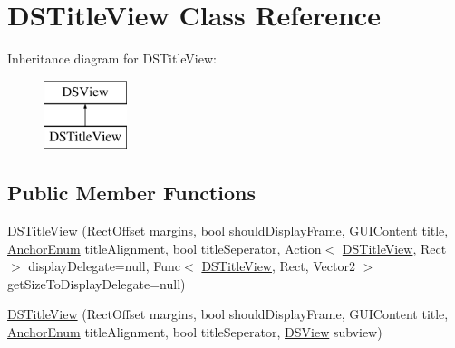 \hypertarget{class_d_s_title_view}{\section{D\+S\+Title\+View Class Reference}
\label{class_d_s_title_view}
}
Inheritance diagram for D\+S\+Title\+View\+:\begin{figure}[H]
\begin{center}
\leavevmode
\includegraphics[height=2.000000cm]{class_d_s_title_view}
\end{center}
\end{figure}
\subsection*{Public Member Functions}
\begin{DoxyCompactItemize}
\item 
\hyperlink{class_d_s_title_view_af8794de8b62891cface73e428b6c067b}{D\+S\+Title\+View} (Rect\+Offset margins, bool should\+Display\+Frame, G\+U\+I\+Content title, \hyperlink{class_d_s_view_a8b41b9ec1b18bd33872a37cbd3a2dbe1}{Anchor\+Enum} title\+Alignment, bool title\+Seperator, Action$<$ \hyperlink{class_d_s_title_view}{D\+S\+Title\+View}, Rect $>$ display\+Delegate=null, Func$<$ \hyperlink{class_d_s_title_view}{D\+S\+Title\+View}, Rect, Vector2 $>$ get\+Size\+To\+Display\+Delegate=null)
\item 
\hyperlink{class_d_s_title_view_a4c93bb2020a2222aca60f7aae1c9ac21}{D\+S\+Title\+View} (Rect\+Offset margins, bool should\+Display\+Frame, G\+U\+I\+Content title, \hyperlink{class_d_s_view_a8b41b9ec1b18bd33872a37cbd3a2dbe1}{Anchor\+Enum} title\+Alignment, bool title\+Seperator, \hyperlink{class_d_s_view}{D\+S\+View} subview)
\end{DoxyCompactItemize}

